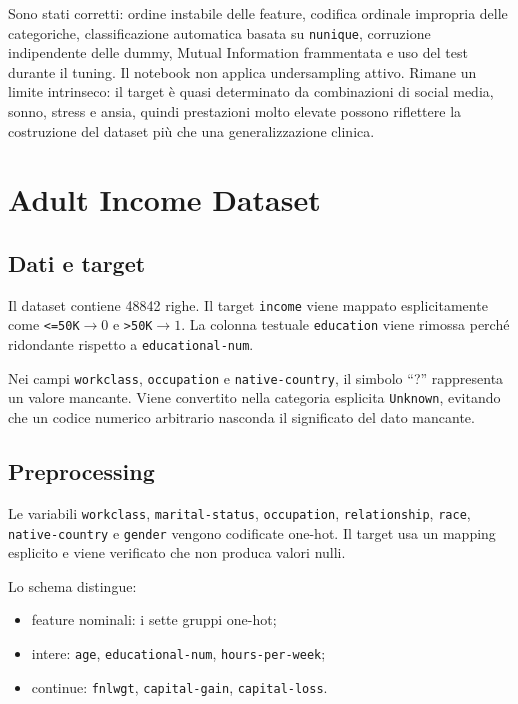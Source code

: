 \documentclass[11pt,a4paper]{article}
\begin{document}
Sono stati corretti: ordine instabile delle feature, codifica ordinale impropria delle categoriche, classificazione automatica basata su \texttt{nunique}, corruzione indipendente delle dummy, Mutual Information frammentata e uso del test durante il tuning. Il notebook non applica undersampling attivo. Rimane un limite intrinseco: il target è quasi determinato da combinazioni di social media, sonno, stress e ansia, quindi prestazioni molto elevate possono riflettere la costruzione del dataset più che una generalizzazione clinica.

\section{Adult Income Dataset}

\subsection{Dati e target}

Il dataset contiene 48842 righe. Il target \texttt{income} viene mappato esplicitamente come \texttt{<=50K}$\to0$ e \texttt{>50K}$\to1$. La colonna testuale \texttt{education} viene rimossa perché ridondante rispetto a \texttt{educational-num}.

Nei campi \texttt{workclass}, \texttt{occupation} e \texttt{native-country}, il simbolo ``?'' rappresenta un valore mancante. Viene convertito nella categoria esplicita \texttt{Unknown}, evitando che un codice numerico arbitrario nasconda il significato del dato mancante.

\subsection{Preprocessing}

Le variabili \texttt{workclass}, \texttt{marital-status}, \texttt{occupation}, \texttt{relationship}, \texttt{race}, \texttt{native-country} e \texttt{gender} vengono codificate one-hot. Il target usa un mapping esplicito e viene verificato che non produca valori nulli.

Lo schema distingue:
\begin{itemize}
    \item feature nominali: i sette gruppi one-hot;
    \item intere: \texttt{age}, \texttt{educational-num}, \texttt{hours-per-week};
    \item continue: \texttt{fnlwgt}, \texttt{capital-gain}, \texttt{capital-loss}.
\end{itemize}
\end{document}
